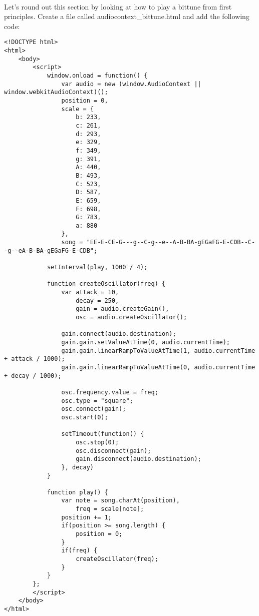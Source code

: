 \documentclass[10pt, a4paper]{article}
\begin{document}
\paragraph{} Let's round out this section by looking at how to play a bittune from first principles. Create a file called audiocontext\_bittune.html and add the following code:

\begin{lstlisting}
<!DOCTYPE html>
<html>
    <body>
        <script>
            window.onload = function() {
                var audio = new (window.AudioContext || window.webkitAudioContext)(); 
                position = 0,
                scale = {
                    b: 233,
                    c: 261,
                    d: 293,
                    e: 329,
                    f: 349,
                    g: 391,
                    A: 440,
                    B: 493,
                    C: 523,
                    D: 587,
                    E: 659,
                    F: 698,
                    G: 783,
                    a: 880
                },
                song = "EE-E-CE-G---g--C-g--e--A-B-BA-gEGaFG-E-CDB--C--g--eA-B-BA-gEGaFG-E-CDB";

            setInterval(play, 1000 / 4);

            function createOscillator(freq) {
                var attack = 10,
                    decay = 250,
                    gain = audio.createGain(),
                    osc = audio.createOscillator();

                gain.connect(audio.destination);
                gain.gain.setValueAtTime(0, audio.currentTime);
                gain.gain.linearRampToValueAtTime(1, audio.currentTime + attack / 1000);
                gain.gain.linearRampToValueAtTime(0, audio.currentTime + decay / 1000);

                osc.frequency.value = freq;
                osc.type = "square";
                osc.connect(gain);
                osc.start(0);

                setTimeout(function() {
                    osc.stop(0);
                    osc.disconnect(gain);
                    gain.disconnect(audio.destination);
                }, decay)
            }

            function play() {
                var note = song.charAt(position),
                    freq = scale[note];
                position += 1;
                if(position >= song.length) {
                    position = 0;
                }
                if(freq) {
                    createOscillator(freq);
                }
            }
        };
        </script>
    </body>
</html>
\end{lstlisting}
\end{document}
